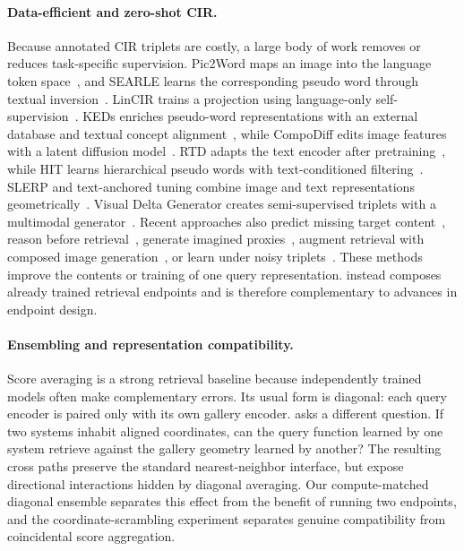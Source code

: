 \paragraph{Data-efficient and zero-shot CIR.}
Because annotated CIR triplets are costly, a large body of work removes or reduces task-specific supervision. Pic2Word maps an image into the language token space~\cite{saito2023pic2word}, and SEARLE learns the corresponding pseudo word through textual inversion~\cite{baldrati2023searle}. LinCIR trains a projection using language-only self-supervision~\cite{gu2024lincir}. KEDs enriches pseudo-word representations with an external database and textual concept alignment~\cite{suo2024keds}, while CompoDiff edits image features with a latent diffusion model~\cite{gu2024compodiff}. RTD adapts the text encoder after pretraining~\cite{byun2025rtd}, while HIT learns hierarchical pseudo words with text-conditioned filtering~\cite{li2025hit}. SLERP and text-anchored tuning combine image and text representations geometrically~\cite{jang2024slerp}. Visual Delta Generator creates semi-supervised triplets with a multimodal generator~\cite{jang2024vdg}. Recent approaches also predict missing target content~\cite{tang2025worldmodel}, reason before retrieval~\cite{tang2025reason}, generate imagined proxies~\cite{li2025imagine}, augment retrieval with composed image generation~\cite{wang2025generative}, or learn under noisy triplets~\cite{li2026conesep}. These methods improve the contents or training of one query representation. \method instead composes already trained retrieval endpoints and is therefore complementary to advances in endpoint design.

\paragraph{Ensembling and representation compatibility.}
Score averaging is a strong retrieval baseline because independently trained models often make complementary errors. Its usual form is diagonal: each query encoder is paired only with its own gallery encoder. \method asks a different question. If two systems inhabit aligned coordinates, can the query function learned by one system retrieve against the gallery geometry learned by another? The resulting cross paths preserve the standard nearest-neighbor interface, but expose directional interactions hidden by diagonal averaging. Our compute-matched diagonal ensemble separates this effect from the benefit of running two endpoints, and the coordinate-scrambling experiment separates genuine compatibility from coincidental score aggregation.
